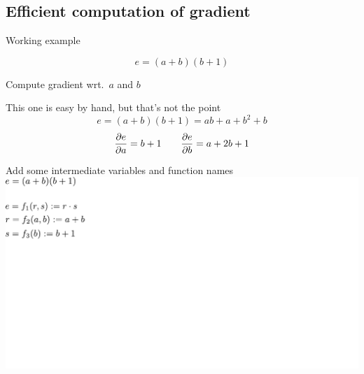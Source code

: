 \documentclass[12pt,aspectratio=169,handout]{beamer}
\begin{document}
\subsection{Efficient computation of gradient}

\begin{frame}{Working example}
	
	$$
	e = (a + b)(b + 1)
	$$
	
	Compute gradient wrt.\ $a$ and $b$
	
	\bigskip
	
	\pause
	
	\begin{block}{This one is easy by hand, but that's not the point}
		$$
		e = (a + b)(b + 1) = ab + a + b^2 + b
		$$
		$$
		\pdv{e}{a} = b + 1 \qquad \pdv{e}{b} = a + 2b + 1
		$$
	\end{block}
	
\end{frame}



\begin{frame}{Add some intermediate variables and function names}
	\includegraphics[width=1.2\linewidth]{img/backprop01.pdf}
\end{frame}
\end{document}
